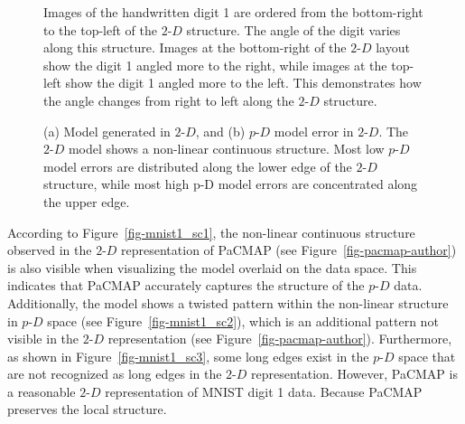 \documentclass[
  12pt]{article}
\newcommand\pD{$p\text{-}D$}
\newcommand\gD{$2\text{-}D$}
\begin{document}
\begin{figure}[H]


\caption{\label{fig-pacmap-author-img}Images of the handwritten digit 1
are ordered from the bottom-right to the top-left of the \(2\text{-}D\)
structure. The angle of the digit varies along this structure. Images at
the bottom-right of the \(2\text{-}D\) layout show the digit 1 angled
more to the right, while images at the top-left show the digit 1 angled
more to the left. This demonstrates how the angle changes from right to
left along the \(2\text{-}D\) structure.}

\end{figure}%

\begin{figure}[H]


\caption{\label{fig-model-mnist}(a) Model generated in \(2\text{-}D\),
and (b) \(p\text{-}D\) model error in \(2\text{-}D\). The \(2\text{-}D\)
model shows a non-linear continuous structure. Most low \(p\text{-}D\)
model errors are distributed along the lower edge of the \(2\text{-}D\)
structure, while most high p-D model errors are concentrated along the
upper edge.}

\end{figure}%

According to Figure~\ref{fig-mnist1_sc1}, the non-linear continuous
structure observed in the \gD{} representation of PaCMAP (see
Figure~\ref{fig-pacmap-author}) is also visible when visualizing the
model overlaid on the data space. This indicates that PaCMAP accurately
captures the structure of the \pD{} data. Additionally, the model shows
a twisted pattern within the non-linear structure in \pD{} space (see
Figure~\ref{fig-mnist1_sc2}), which is an additional pattern not visible
in the \gD{} representation (see Figure~\ref{fig-pacmap-author}).
Furthermore, as shown in Figure~\ref{fig-mnist1_sc3}, some long edges
exist in the \pD{} space that are not recognized as long edges in the
\gD{} representation. However, PaCMAP is a reasonable \gD{}
representation of MNIST digit 1 data. Because PaCMAP preserves the local
structure.
\end{document}
